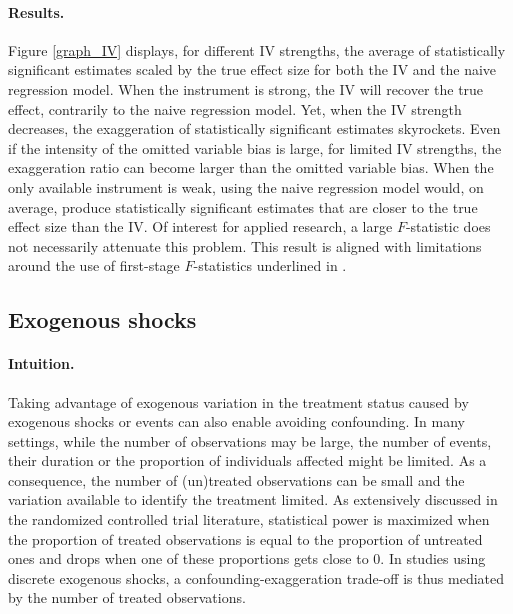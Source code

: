\documentclass[usletter, 12pt]{article}
\begin{document}
		\paragraph{Results.} 
			Figure \ref{graph_IV} displays, for different IV strengths, the average of statistically significant estimates scaled by the true effect size for both the IV and the naive regression model. When the instrument is strong, the IV will recover the true effect, contrarily to the naive regression model. Yet, when the IV strength decreases, the exaggeration of statistically significant estimates skyrockets. Even if the intensity of the omitted variable bias is large, for limited IV strengths, the exaggeration ratio can become larger than the omitted variable bias. When the only available instrument is weak, using the naive regression model would, on average, produce statistically significant estimates that are closer to the true effect size than the IV. Of interest for applied research, a large $F$-statistic does not necessarily attenuate this problem. This result is aligned with limitations around the use of first-stage $F$-statistics underlined in \cite{youngConsistencyInferenceInstrumental2022}.
		




		\subsection{Exogenous shocks}\label{sim_shocks}
    
        			\paragraph{Intuition.}  Taking advantage of exogenous variation in the treatment status caused by exogenous shocks or events can also enable avoiding confounding. In many settings, while the number of observations may be large, the number of events, their duration or the proportion of individuals affected might be limited. As a consequence, the number of (un)treated observations can be small and the variation available to identify the treatment limited. As extensively discussed in the randomized controlled trial literature, statistical power is maximized when the proportion of treated observations is equal to the proportion of untreated ones and drops when one of these proportions gets close to 0. In studies using discrete exogenous shocks, a confounding-exaggeration trade-off is thus mediated by the number of treated observations. %
			
\end{document}
